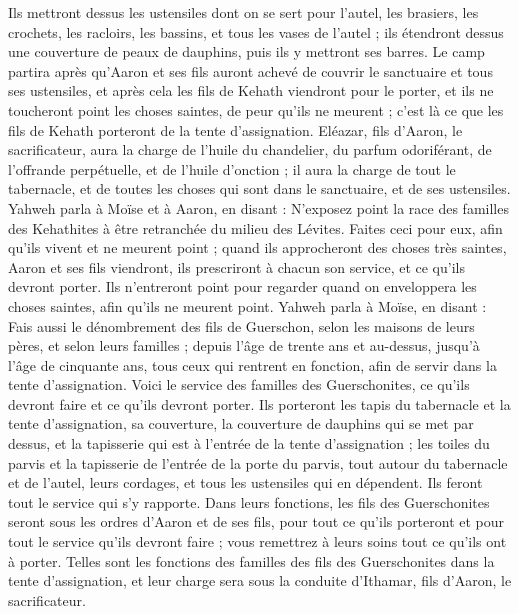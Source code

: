 \begin{multicols}{2}
Ils mettront dessus les ustensiles dont on se sert pour l'autel, les brasiers, les crochets, les racloirs, les bassins, et tous les vases de l'autel ; ils étendront dessus une couverture de peaux de dauphins, puis ils y mettront ses barres.
Le camp partira après qu'Aaron et ses fils auront achevé de couvrir le sanctuaire et tous ses ustensiles, et après cela les fils de Kehath viendront pour le porter, et ils ne toucheront point les choses saintes, de peur qu'ils ne meurent ; c'est là ce que les fils de Kehath porteront de la tente d'assignation.
Eléazar, fils d'Aaron, le sacrificateur, aura la charge de l'huile du chandelier, du parfum odoriférant, de l’offrande perpétuelle, et de l'huile d'onction ; il aura la charge de tout le tabernacle, et de toutes les choses qui sont dans le sanctuaire, et de ses ustensiles.
Yahweh parla à Moïse et à Aaron, en disant :
N’exposez point la race des familles des Kehathites à être retranchée du milieu des Lévites.
Faites ceci pour eux, afin qu'ils vivent et ne meurent point ; quand ils approcheront des choses très saintes, Aaron et ses fils viendront, ils prescriront à chacun son service, et ce qu'ils devront porter.
Ils n'entreront point pour regarder quand on enveloppera les choses saintes, afin qu'ils ne meurent point.
Yahweh parla à Moïse, en disant :
Fais aussi le dénombrement des fils de Guerschon, selon les maisons de leurs pères, et selon leurs familles ;
depuis l'âge de trente ans et au-dessus, jusqu'à l'âge de cinquante ans, tous ceux qui rentrent en fonction, afin de servir dans la tente d'assignation.
Voici le service des familles des Guerschonites, ce qu’ils devront faire et ce qu’ils devront porter.
Ils porteront les tapis du tabernacle et la tente d'assignation, sa couverture, la couverture de dauphins qui se met par dessus, et la tapisserie qui est à l'entrée de la tente d'assignation ;
les toiles du parvis et la tapisserie de l'entrée de la porte du parvis, tout autour du tabernacle et de l’autel, leurs cordages, et tous les ustensiles qui en dépendent. Ils feront tout le service qui s’y rapporte.
Dans leurs fonctions, les fils des Guerschonites seront sous les ordres d'Aaron et de ses fils, pour tout ce qu’ils porteront et pour tout le service qu’ils devront faire ; vous remettrez à leurs soins tout ce qu’ils ont à porter.
Telles sont les fonctions des familles des fils des Guerschonites dans la tente d'assignation, et leur charge sera sous la conduite d'Ithamar, fils d'Aaron, le sacrificateur.

\end{multicols}
